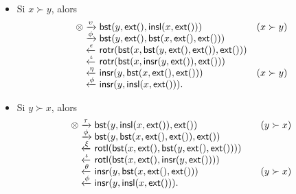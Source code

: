 \begin{itemize}

  \item Si \(x \succ y\), alors
\begin{equation*}
\begin{array}{@{}r@{\;}l@{\;}l@{\quad}r@{}}
\otimes
& \xrightarrow{\smash{\upsilon}} &
  \fun{bst}(y,\fun{ext}(),\fun{insl}(x,\fun{ext}()))
& (x \succ y)\\
& \xrightarrow{\smash{\phi}} &
  \fun{bst}(y,\fun{ext}(),\fun{bst}(x,\fun{ext}(),\fun{ext}()))\\
& \xleftarrow{\smash{\epsilon}} &
\fun{rotr}(\fun{bst}(x,\fun{bst}(y,\fun{ext}(),\fun{ext}()),\fun{ext}()))\\
& \xleftarrow{\smash{\iota}} &
  \fun{rotr}(\fun{bst}(x,\fun{insr}(y,\fun{ext}()),\fun{ext}()))\\
& \xleftarrow{\smash{\eta}} &
  \fun{insr}(y,\fun{bst}(x,\fun{ext}(),\fun{ext}()))
& (x \succ y)\\
& \xleftarrow{\smash{\phi}} &
  \fun{insr}(y,\fun{insl}(x,\fun{ext}())).
\end{array}
\end{equation*}

  \item Si \(y \succ x\), alors
\begin{equation*}
\begin{array}{@{}r@{\;}l@{\;}l@{\qquad}r@{}}
\otimes & \xrightarrow{\smash{\tau}} &
  \fun{bst}(y,\fun{insl}(x,\fun{ext}()),\fun{ext}())
& (y \succ x)\\
& \xrightarrow{\smash{\phi}} &
  \fun{bst}(y,\fun{bst}(x,\fun{ext}(),\fun{ext}()),\fun{ext}())\\
& \xleftarrow{\smash{\xi}} &
\fun{rotl}(\fun{bst}(x,\fun{ext}(),\fun{bst}(y,\fun{ext}(),\fun{ext}())))\\
& \xleftarrow{\smash{\iota}} &
  \fun{rotl}(\fun{bst}(x,\fun{ext}(),\fun{insr}(y,\fun{ext}())))\\
& \xleftarrow{\smash{\theta}} &
  \fun{insr}(y,\fun{bst}(x,\fun{ext}(),\fun{ext}()))
& (y \succ x)\\
& \xleftarrow{\smash{\phi}} &
  \fun{insr}(y,\fun{insl}(x,\fun{ext}())).
\end{array}
\end{equation*}
\end{itemize}

